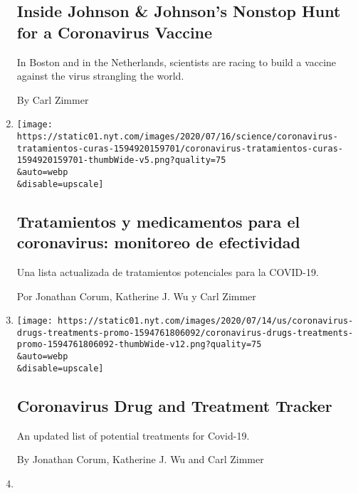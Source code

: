 \begin{enumerate}
  \hypertarget{inside-johnson--johnsons-nonstop-hunt-for-a-coronavirus-vaccine}{%
  \subsection{Inside Johnson \& Johnson's Nonstop Hunt for a Coronavirus
  Vaccine}\label{inside-johnson--johnsons-nonstop-hunt-for-a-coronavirus-vaccine}}

  In Boston and in the Netherlands, scientists are racing to build a
  vaccine against the virus strangling the world.

  By Carl Zimmer
\item
  \href{/es/interactive/2020/science/coronavirus-tratamientos-curas.html}{}

  \texttt{[image: https://static01.nyt.com/images/2020/07/16/science/coronavirus-tratamientos-curas-1594920159701/coronavirus-tratamientos-curas-1594920159701-thumbWide-v5.png?quality=75\\\&auto=webp\\\&disable=upscale]}

  \hypertarget{tratamientos-y-medicamentos-para-el-coronavirus-monitoreo-de-efectividad}{%
  \subsection{Tratamientos y medicamentos para el coronavirus: monitoreo
  de
  efectividad}\label{tratamientos-y-medicamentos-para-el-coronavirus-monitoreo-de-efectividad}}

  Una lista actualizada de tratamientos potenciales para la COVID-19.

  Por Jonathan Corum, Katherine J. Wu y Carl Zimmer
\item
  \href{/interactive/2020/science/coronavirus-drugs-treatments.html}{}

  \texttt{[image: https://static01.nyt.com/images/2020/07/14/us/coronavirus-drugs-treatments-promo-1594761806092/coronavirus-drugs-treatments-promo-1594761806092-thumbWide-v12.png?quality=75\\\&auto=webp\\\&disable=upscale]}

  \hypertarget{coronavirus-drug-and-treatment-tracker}{%
  \subsection{Coronavirus Drug and Treatment
  Tracker}\label{coronavirus-drug-and-treatment-tracker}}

  An updated list of potential treatments for Covid-19.

  By Jonathan Corum, Katherine J. Wu and Carl Zimmer
\item
  \href{/2020/07/15/science/coronavirus-blood-type.html}{}


\end{enumerate}
